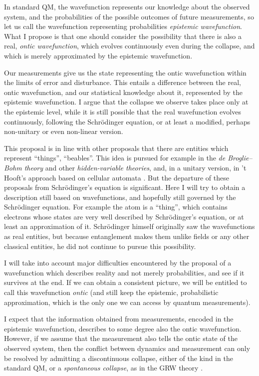 \documentclass[11pt]{amsart}
\theoremstyle{definition}
\theoremstyle{plain}
\begin{document}
In standard QM, the wavefunction represents our knowledge about the observed system, and the probabilities of the possible outcomes of future measurements, so let us call the wavefunction representing probabilities \emph{epistemic wavefunction}. What I propose is that one should consider the possibility that there is also a real, \emph{ontic wavefunction}, which evolves continuously even during the collapse, and which is merely approximated by the epistemic wavefunction. 

Our measurements give us the state representing the ontic wavefunction within the limits of error and disturbance. This entails a difference between the real, ontic wavefunction, and our statistical knowledge about it, represented by the epistemic wavefunction. I argue that the collapse we observe takes place only at the epistemic level, while it is still possible that the real wavefunction evolves continuously, following the Schr\"odinger equation, or at least a modified, perhaps non-unitary or even non-linear version.

This proposal is in line with other proposals that there are entities which represent ``things'', ``beables''. This idea is pursued for example in the \emph{de Broglie--Bohm theory} \cite{deBroglie1926OndesEtMouvements,Bohm52,DGZ1996BohmianMechanics,DGZ2012QPhysWithoutQPhil} and other \emph{hidden-variable theories}, and, in a unitary version, in 't Hooft's approach based on cellular automata \cite{tHooft2014CellularAutomatonInterpretationQM}. But the departure of these proposals from Schr\"odinger's equation is significant.
Here I will try to obtain a description still based on wavefunctions, and hopefully still governed by the Schr\"odinger equation. For example the atom is a ``thing'', which contains electrons whose states are very well described by Schr\"odinger's equation, or at least an approximation of it. Schr\"odinger himself originally saw the wavefunctions as real entities, but because entanglement makes them unlike fields or any other classical entities, he did not continue to pursue this possibility.

I will take into account major difficulties encountered by the proposal of a wavefunction which describes reality and not merely probabilities, and see if it survives at the end. If we can obtain a consistent picture, we will be entitled to call this wavefunction \emph{ontic} (and still keep the epistemic, probabilistic approximation, which is the only one we can access by quantum measurements).

I expect that the information obtained from measurements, encoded in the epistemic wavefunction, describes to some degree also the ontic wavefunction. However, if we assume that the measurement also tells the ontic state of the observed system, then the conflict between dynamics and measurement can only be resolved by admitting a discontinuous collapse, either of the kind in the standard QM, or a \emph{spontaneous collapse}, as in the GRW theory \cite{GRW86,Diosi1989UniversalReduction}.
\end{document}
